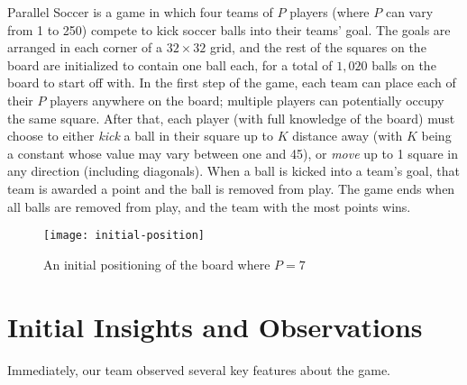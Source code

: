\documentclass[
10pt, %
letterpaper, %
oneside, %
headinclude,footinclude, %
english
]{article}
\begin{document}
Parallel Soccer is a game in which four teams of $P$ players (where $P$ can vary from 1 to 250) compete to kick soccer balls into their teams' goal. The goals are arranged in each corner of a $32 \times 32$ grid, and the rest of the squares on the board are initialized to contain one ball each, for a total of $1,020$ balls on the board to start off with. In the first step of the game, each team can place each of their $P$ players anywhere on the board; multiple players can potentially occupy the same square. After that, each player (with full knowledge of the board) must choose to either \textit{kick} a ball in their square up to $K$ distance away (with $K$ being a constant whose value may vary between one and 45), or \textit{move} up to 1 square in any direction (including diagonals). When a ball is kicked into a team's goal, that team is awarded a point and the ball is removed from play. The game ends when all balls are removed from play, and the team with the most points wins.

\begin{figure}[ht!]
\centering
\texttt{[image: initial-position]}
\caption[Initial board of a parallel football game]{An initial positioning of the board where $P=7$}
\label{fig:gallery}
\end{figure}
\pagebreak

\section{Initial Insights and Observations}

Immediately, our team observed several key features about the game.
\end{document}
